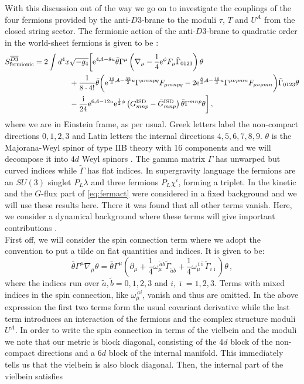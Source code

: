 \documentclass[a4paper,12pt,twoside,openright]{report}
\newcommand{\be}{\begin{equation}}
\newcommand{\ee}{\end{equation}}
\newcommand{\bea}{\begin{equation}\begin{aligned}}
\newcommand{\eea}{\end{aligned}\end{equation}}
\def\rmi{{\rm i}}
\def\rme{{\rm e}}
\def\ib{{\bar \imath}}
\begin{document}
With this discussion out of the way we go on to investigate the couplings of the four fermions provided by the anti-$D3$-brane to the moduli $\tau$, $T$ and $U^A$ from the closed string sector. The fermionic action of the anti-$D3$-brane \cite{Bergshoeff:2015jxa,GarciadelMoral:2017vnz,Grana:2002tu,McGuirk:2012sb} to quadratic order in the world-sheet fermions is given to be \cite{Bergshoeff:2015jxa,Martucci:2005rb,Bergshoeff:2005yp}:
\bea 
S_{\text{fermionic}}^{\overline{D3}} = 2 \int d^4x & \sqrt{-g_4} \bigg[ \rme^{4\mathcal{A} - 8u} \bar{\theta}\Gamma^\mu \left( \nabla_\mu - \frac{1}{4} \rme^\phi F_\mu \tilde{\Gamma}_{0123}\right)\theta\\
&+ \frac{1}{8\cdot 4!} \bar{\theta} \bigg(\rme^{\frac{16}{3} \mathcal{A} - \frac{32}{3} u} \Gamma^{\mu mnpq}F_{\mu mnpq} - 2 \rme^{\frac{8}{3} \mathcal{A} - \frac{16}{3} u} \Gamma^{\mu\nu\rho mn} F_{\mu\nu\rho mn}\bigg) \tilde{\Gamma}_{0123}\theta\\
&- \frac{\rmi}{24} \rme^{6\mathcal{A} - 12u} \rme^{\frac{1}{2} \phi} \left( G_{mnp}^{\text{ISD}} - \bar{G}_{mnp}^{\text{ISD}}\right) \bar{\theta} \Gamma^{mnp} \theta \bigg]\,,
\label{eq:fermact}
\eea
where we are in Einstein frame, as per usual. Greek letters label the non-compact directions $0,1,2,3$ and Latin letters the internal directions $4,5,6,7,8,9$. $\theta$ is the Majorana-Weyl spinor of type IIB theory with 16 components and we will decompose it into $4d$ Weyl spinors \cite{Bergshoeff:2015jxa,Grana:2002tu}. The gamma matrix $\Gamma$ has unwarped but curved indices while $\tilde{\Gamma}$ has flat indices. In supergravity language \cite{Freedman:2012zz} the fermions are an $SU(3)$ singlet $P_L\lambda$ and three fermions $P_L\chi^i$, forming a triplet. In \cite{Bergshoeff:2015jxa} the kinetic and the $G$-flux part of \eqref{eq:fermact} were considered in a fixed background and we will use these results here. There it was found that all other terms vanish. Here, we consider a dynamical background where these terms will give important contributions \cite{Cribiori:2019hod}.\\
First off, we will consider the spin connection term where we adopt the convention to put a tilde on flat quantities and indices. It is given to be:
\be
\bar{\theta} \Gamma^\mu \nabla_\mu \theta = \bar{\theta} \Gamma^\mu \left(\partial_\mu + \frac{1}{4} \omega_\mu^{\,\tilde{a}\tilde{b}} \tilde{\Gamma}_{\tilde{a}\tilde{b}} + \frac{1}{4} \omega_\mu^{\,i\ib} \tilde{\Gamma}_{i\ib}\right) \theta\,,
\ee
where the indices run over $\tilde{a},\tilde{b} = 0,1,2,3$ and $i,\ib=1,2,3$. Terms with mixed indices in the spin connection, like $\omega_\mu^{\,\tilde{a}i}$, vanish and thus are omitted. In the above expression the first two terms form the usual covariant derivative while the last term introduces an interaction of the fermions and the complex structure moduli $U^A$. In order to write the spin connection in terms of the vielbein and the moduli we note that our metric is block diagonal, consisting of the $4d$ block of the non-compact directions and a $6d$ block of the internal manifold. This immediately tells us that the vielbein is also block diagonal. Then, the internal part of the vielbein satisfies
\end{document}
